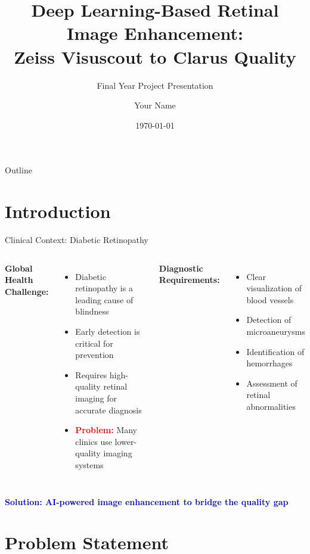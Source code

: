 \documentclass[aspectratio=169]{beamer}
\title[Retinal Image Enhancement]{Deep Learning-Based Retinal Image Enhancement:\\Zeiss Visuscout to Clarus Quality}
\subtitle{Final Year Project Presentation}
\author{Your Name}
\institute{Your University\\Department of Computer Science/Engineering}
\date{\today}
\begin{document}
\begin{frame}
\titlepage
\end{frame}

\begin{frame}{Outline}
\tableofcontents
\end{frame}

\section{Introduction}

\begin{frame}{Clinical Context: Diabetic Retinopathy}
\begin{columns}[T]
\textbf{Global Health Challenge:}
\begin{itemize}
    \item Diabetic retinopathy is a leading cause of blindness
    \item Early detection is critical for prevention
    \item Requires high-quality retinal imaging for accurate diagnosis
    \item \textcolor{red}{\textbf{Problem:}} Many clinics use lower-quality imaging systems
\end{itemize}

\textbf{Diagnostic Requirements:}
\begin{itemize}
    \item Clear visualization of blood vessels
    \item Detection of microaneurysms
    \item Identification of hemorrhages
    \item Assessment of retinal abnormalities
\end{itemize}
\end{columns}

\vspace{0.5cm}
\centering
\textcolor{blue}{\large \textbf{Solution: AI-powered image enhancement to bridge the quality gap}}
\end{frame}

\section{Problem Statement}
\end{document}
